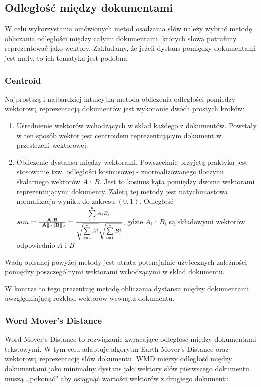 \documentclass[pl]{minipw} %
\begin{document}
\subsection{Odległość między dokumentami}
W celu wykorzystania omówionych metod osadzania słów należy wybrać metodę obliczania odległości między całymi dokumentami, których słowa potrafimy reprezentować jako wektory. Zakładamy, że jeżeli dystans pomiędzy dokumentami jest mały, to ich tematyka jest podobna.
\subsubsection{Centroid}
Najprostszą i najbardziej intuicyjną metodą obliczenia odległości pomiędzy wektorową reprezentacją dokumentów jest wykonanie dwóch prostych kroków:
\begin{enumerate}
	\item Uśrednienie wektorów wchodzących w skład każdego z dokumentów. Powstały w ten sposób wektor jest centroidem reprezentującym dokument w przestrzeni wektorowej.
	\item Obliczenie dystansu między wektorami. Powszechnie przyjętą praktyką jest stosowanie tzw. odległości kosinusowej - znormalizowanego iloczynu skalarnego wektorów $A$ i $B$. Jest to kosinus kąta pomiędzy dwoma wektorami reprezentującymi dokumenty. Zaletą tej metody jest natychmiastowa normalizacja wyniku do zakresu $(0, 1)$. Odległość $sim={\mathbf {A} \cdot \mathbf {B}  \over \|\mathbf {A} \|_{2}\|\mathbf {B} \|_{2}}={\frac {\sum \limits _{i=1}^{n}{A_{i}B_{i}}}{{\sqrt {\sum \limits _{i=1}^{n}{A_{i}^{2}}}}{\sqrt {\sum \limits _{i=1}^{n}{B_{i}^{2}}}}}}$,
	gdzie $A_i$ i $B_i$ są składowymi wektorów odpowiednio $A$ i $B$
\end{enumerate}
Wadą opisanej powyżej metody jest utrata potencjalnie użytecznych zależności pomiędzy poszczególnymi wektorami wchodzącymi w skład dokumentu.

W kontrze to tego prezentuję metodę obliczania dystansu między dokumentami uwzględniającą rozkład wektorów wewnątz dokumentu.

\subsubsection{Word Mover's Distance}
Word Mover's Distance\cite{wmd} to rozwiązanie zwracające odległość między dokumentami tekstowymi. W tym celu adaptuje algorytm Earth Mover's Distance\cite{emd} oraz wektorową reprezentację słów dokumentu. WMD mierzy odległość między dokumentami jako minimalny dystans jaki wektory słów pierwszego dokumentu muszą ,,pokonać'' aby osiągnąć wartości wektorów z drugiego dokumentu.
\end{document}
